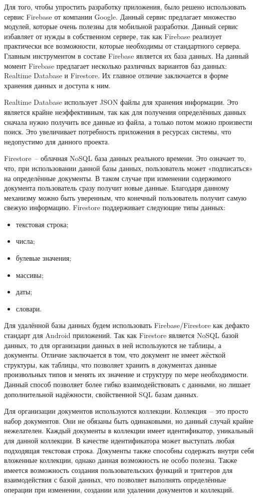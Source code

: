 Для того, чтобы упростить разработку приложения, было решено использовать сервис Firebase от компании Google. Данный сервис предлагает множество модулей, которые очень полезны для мобильной разработки. Данный сервис избавляет от нужды в собственном сервере, так как Firebase реализует практически все возможности, которые необходимы от стандартного сервера. Главным инструментом в составе Firebase является их база данных. На данный момент Firebase предлагает несколько различных вариантов баз данных: Realtime Database и Firestore. Их главное отличие заключается в форме хранения данных и доступа к ним. 

Realtime Database использует JSON файлы для хранения информации. Это является крайне неэффективным, так как для получения определённых данных сначала нужно получить все данные из файла, а только потом можно произвести поиск. Это увеличивает потребность приложения в ресурсах системы, что недопустимо для данного проекта. 

Firestore~-- облачная NoSQL база данных реального времени. Это означает то, что, при использовании данной базы данных, пользователь может «подписаться» на определённые документы. В таком случае при изменении содержимого документа пользователь сразу получит новые данные. Благодаря данному механизму можно быть уверенным, что конечный пользователь получит самую свежую информацию. Firestore поддерживает следующие типы данных:

\begin{itemize}
    \item текстовая строка;
    \item числа;
    \item булевые значения;
    \item массивы;
    \item даты;
    \item словари.
\end{itemize}

Для удалённой базы данных будем использовать Firebase/Firestore как дефакто стандарт для Android приложений. Так как Firestore является NoSQL базой данных, то для организации данных в ней используются не таблицы, а документы. Отличие заключается в том, что документ не имеет жёсткой структуры, как таблицы, что позволяет хранить в документах данные произвольных типов и менять их значение и структуру по мере необходимости. Данный способ позволяет более гибко взаимодействовать с данными, но лишает дополнительной надёжности, свойственной SQL базам данных.

Для организации документов используются коллекции. Коллекция~-- это просто набор документов. Они не обязаны быть одинаковыми, но данный случай крайне нежелателен. Каждый документы в коллекции имеет идентификатор, уникальный для данной коллекции. В качестве идентификатора может выступать любая подходящая текстовая строка. Документы также способны содержать внутри себя вложенные коллекции, однако данная возможность не особо полезна. Также имеется возможность создания пользовательских функций и триггеров для взаимодействия с базой данных, что позволяет выполнять определённые операции при изменении, создании или удалении документов и коллекций. 

